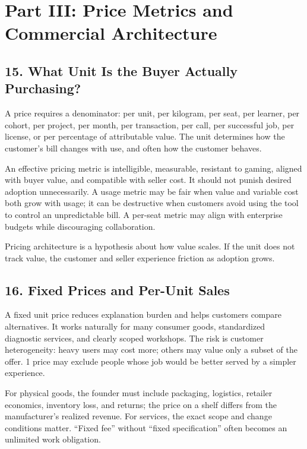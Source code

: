 \section*{Part III: Price Metrics and Commercial Architecture}

\subsection*{15. What Unit Is the Buyer Actually Purchasing?}

A price requires a denominator: per unit, per kilogram, per seat, per learner, per cohort, per project, per month, per transaction, per call, per successful job, per license, or per percentage of attributable value. The unit determines how the customer's bill changes with use, and often how the customer behaves.

An effective pricing metric is intelligible, measurable, resistant to gaming, aligned with buyer value, and compatible with seller cost. It should not punish desired adoption unnecessarily. A usage metric may be fair when value and variable cost both grow with usage; it can be destructive when customers avoid using the tool to control an unpredictable bill. A per-seat metric may align with enterprise budgets while discouraging collaboration.

Pricing architecture is a hypothesis about how value scales. If the unit does not track value, the customer and seller experience friction as adoption grows.

\subsection*{16. Fixed Prices and Per-Unit Sales}

A fixed unit price reduces explanation burden and helps customers compare alternatives. It works naturally for many consumer goods, standardized diagnostic services, and clearly scoped workshops. The risk is customer heterogeneity: heavy users may cost more; others may value only a subset of the offer. 1 price may exclude people whose job would be better served by a simpler experience.

For physical goods, the founder must include packaging, logistics, retailer economics, inventory loss, and returns; the price on a shelf differs from the manufacturer's realized revenue. For services, the exact scope and change conditions matter. ``Fixed fee'' without ``fixed specification'' often becomes an unlimited work obligation.

